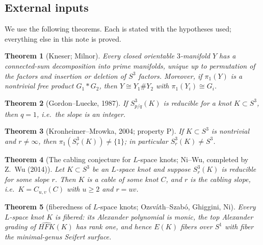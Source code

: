 \documentclass[11pt]{article}
\newtheorem{theorem}{Theorem}[section]
\theoremstyle{definition}
\theoremstyle{remark}
\newcommand{\HFK}{\widehat{HFK}}
\begin{document}
\subsection{External inputs}

We use the following theorems.  Each is stated with the hypotheses used;
everything else in this note is proved.

\begin{theorem}[Kneser; Milnor]\label{thm:knmilnor}
Every closed orientable $3$-manifold $Y$ has a connected-sum decomposition
into prime manifolds, unique up to permutation of the factors and insertion or
deletion of $S^3$ factors.  Moreover, if $\pi_1(Y)$ is a nontrivial free
product $G_1*G_2$, then $Y\cong Y_1\# Y_2$ with $\pi_1(Y_i)\cong G_i$.
\end{theorem}

\begin{theorem}[Gordon--Luecke, 1987]\label{thm:gl}
If $S^3_{p/q}(K)$ is reducible for a knot $K\subset S^3$, then $q=1$, i.e.\
the slope is an integer.
\end{theorem}

\begin{theorem}[Kronheimer--Mrowka, 2004; property P]\label{thm:propP}
If $K\subset S^3$ is nontrivial and $r\ne\infty$, then
$\pi_1(S^3_r(K))\ne \{1\}$; in particular $S^3_r(K)\ne S^3$.
\end{theorem}

\begin{theorem}[The cabling conjecture for $L$-space knots; Ni--Wu, completed
by Z.~Wu (2014)]\label{thm:niwu}
Let $K\subset S^3$ be an $L$-space knot and suppose $S^3_r(K)$ is reducible
for some slope $r$.  Then $K$ is a cable of some knot $C$, and $r$ is the
cabling slope, i.e.\ $K=C_{u,v}(C)$ with $u\ge 2$ and $r=uv$.
\end{theorem}

\begin{theorem}[fiberedness of $L$-space knots; Ozsv\'ath--Szab\'o, Ghiggini,
Ni]\label{thm:fibered}
Every $L$-space knot $K$ is fibered: its Alexander polynomial is monic, the
top Alexander grading of $\HFK(K)$ has rank one, and hence
$E(K)$ fibers over $S^1$ with fiber the minimal-genus Seifert surface.
\end{theorem}
\end{document}
